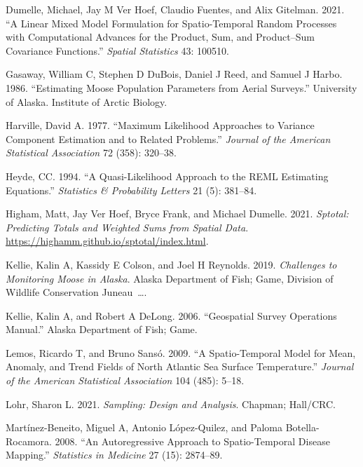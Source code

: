 \documentclass[]{article}    %
\newlength{\cslhangindent}
\newlength{\cslentryspacingunit} %
\newenvironment{CSLReferences}[2] %
 {%
  \setlength{\parindent}{0pt}
  \ifodd #1
  \let\oldpar\par
  \def\par{\hangindent=\cslhangindent\oldpar}
  \fi
  \setlength{\parskip}{#2\cslentryspacingunit}
 }%
 {}
\begin{document}
\begin{CSLReferences}{1}{0}
\leavevmode{}%
Dumelle, Michael, Jay M Ver Hoef, Claudio Fuentes, and Alix Gitelman.
2021. {``A Linear Mixed Model Formulation for Spatio-Temporal Random
Processes with Computational Advances for the Product, Sum, and
Product--Sum Covariance Functions.''} \emph{Spatial Statistics} 43:
100510.

\leavevmode{}%
Gasaway, William C, Stephen D DuBois, Daniel J Reed, and Samuel J Harbo.
1986. {``Estimating Moose Population Parameters from Aerial Surveys.''}
University of Alaska. Institute of Arctic Biology.

\leavevmode{}%
Harville, David A. 1977. {``Maximum Likelihood Approaches to Variance
Component Estimation and to Related Problems.''} \emph{Journal of the
American Statistical Association} 72 (358): 320--38.

\leavevmode{}%
Heyde, CC. 1994. {``A Quasi-Likelihood Approach to the REML Estimating
Equations.''} \emph{Statistics \& Probability Letters} 21 (5): 381--84.

\leavevmode{}%
Higham, Matt, Jay Ver Hoef, Bryce Frank, and Michael Dumelle. 2021.
\emph{Sptotal: Predicting Totals and Weighted Sums from Spatial Data}.
\url{https://highamm.github.io/sptotal/index.html}.

\leavevmode{}%
Kellie, Kalin A, Kassidy E Colson, and Joel H Reynolds. 2019.
\emph{Challenges to Monitoring Moose in Alaska}. Alaska Department of
Fish; Game, Division of Wildlife Conservation Juneau~\ldots.

\leavevmode{}%
Kellie, Kalin A, and Robert A DeLong. 2006. {``Geospatial Survey
Operations Manual.''} Alaska Department of Fish; Game.

\leavevmode{}%
Lemos, Ricardo T, and Bruno Sansó. 2009. {``A Spatio-Temporal Model for
Mean, Anomaly, and Trend Fields of North Atlantic Sea Surface
Temperature.''} \emph{Journal of the American Statistical Association}
104 (485): 5--18.

\leavevmode{}%
Lohr, Sharon L. 2021. \emph{Sampling: Design and Analysis}. Chapman;
Hall/CRC.

\leavevmode{}%
Martínez-Beneito, Miguel A, Antonio López-Quilez, and Paloma
Botella-Rocamora. 2008. {``An Autoregressive Approach to Spatio-Temporal
Disease Mapping.''} \emph{Statistics in Medicine} 27 (15): 2874--89.


\end{CSLReferences}
\end{document}
